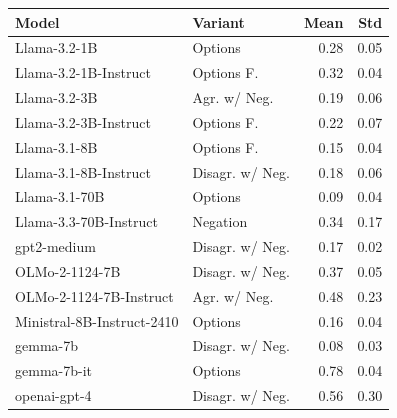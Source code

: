\begin{tabular}{llrr}
\toprule
Model & Variant & Mean & Std \\
\midrule
Llama-3.2-1B & Options & 0.28 & 0.05 \\
Llama-3.2-1B-Instruct & Options F. & 0.32 & 0.04 \\
Llama-3.2-3B & Agr. w/ Neg. & 0.19 & 0.06 \\
Llama-3.2-3B-Instruct & Options F. & 0.22 & 0.07 \\
Llama-3.1-8B & Options F. & 0.15 & 0.04 \\
Llama-3.1-8B-Instruct & Disagr. w/ Neg. & 0.18 & 0.06 \\
Llama-3.1-70B & Options & 0.09 & 0.04 \\
Llama-3.3-70B-Instruct & Negation & 0.34 & 0.17 \\
gpt2-medium & Disagr. w/ Neg. & 0.17 & 0.02 \\
OLMo-2-1124-7B & Disagr. w/ Neg. & 0.37 & 0.05 \\
OLMo-2-1124-7B-Instruct & Agr. w/ Neg. & 0.48 & 0.23 \\
Ministral-8B-Instruct-2410 & Options & 0.16 & 0.04 \\
gemma-7b & Disagr. w/ Neg. & 0.08 & 0.03 \\
gemma-7b-it & Options & 0.78 & 0.04 \\
openai-gpt-4 & Disagr. w/ Neg. & 0.56 & 0.30 \\
\bottomrule
\end{tabular}
